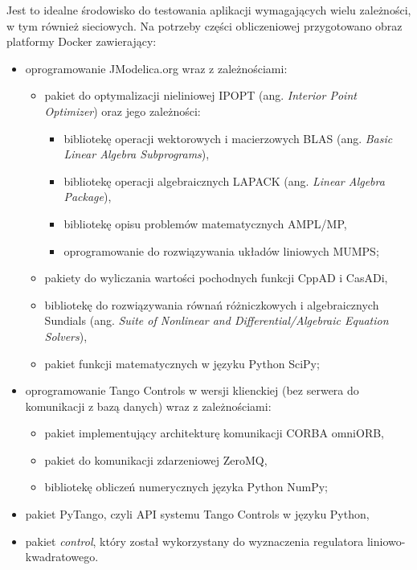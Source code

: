 Jest to idealne środowisko do testowania aplikacji wymagających wielu zależności, w tym również sieciowych. Na potrzeby części obliczeniowej przygotowano obraz platformy Docker zawierający:
\begin{itemize}
    \item oprogramowanie JModelica.org wraz z zależnościami:
    \begin{itemize}
        \item pakiet do optymalizacji nieliniowej IPOPT (ang. \emph{Interior Point Optimizer}) oraz jego zależności:
        \begin{itemize}
            \item bibliotekę operacji wektorowych i macierzowych BLAS (ang. \emph{Basic Linear Algebra Subprograms}),
            \item bibliotekę operacji algebraicznych LAPACK (ang. \emph{Linear Algebra Package}),
            \item bibliotekę opisu problemów matematycznych AMPL/MP,
            \item oprogramowanie do rozwiązywania układów liniowych MUMPS;
        \end{itemize}
        \item pakiety do wyliczania wartości pochodnych funkcji CppAD i CasADi,
        \item bibliotekę do rozwiązywania równań różniczkowych i algebraicznych Sundials (ang. \emph{Suite of Nonlinear and Differential/Algebraic Equation Solvers}),
        \item pakiet funkcji matematycznych w języku Python SciPy;
    \end{itemize}
    \item oprogramowanie Tango Controls w wersji klienckiej (bez serwera do komunikacji z bazą danych) wraz z zależnościami:
    \begin{itemize}
        \item pakiet implementujący architekturę komunikacji CORBA omniORB,
        \item pakiet do komunikacji zdarzeniowej ZeroMQ,
        \item bibliotekę obliczeń numerycznych języka Python NumPy;
    \end{itemize}
    \item pakiet PyTango, czyli API systemu Tango Controls w języku Python,
    \item pakiet \emph{control}, który został wykorzystany do wyznaczenia regulatora liniowo-kwadratowego.
\end{itemize}

